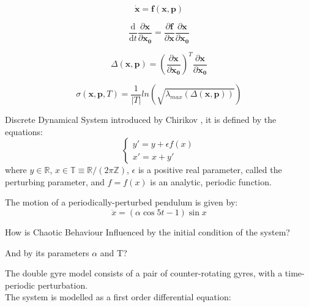 \documentclass{juliacon}
\newcommand{\drv}{\textrm{d}}
\begin{document}
\begin{equation}
    \dot{\mathbf{x}}=\mathbf{f}(\mathbf{x}, \mathbf{p})
\end{equation}

\begin{equation}
    \frac{\drv}{\drv t} \frac{\partial \mathbf{x} }{\partial \mathbf{x_0}} = \frac{\partial \mathbf{f}}{\partial \mathbf{x}}\frac{\partial \mathbf{x}}{\partial \mathbf{x_0}}
\end{equation}

\begin{equation}
    \Delta(\mathbf{x}, \mathbf{p}) = \left( \frac{\partial \mathbf{x}}{\partial \mathbf{x_0}}\right)^T \frac{\partial \mathbf{x}}{\partial \mathbf{x_0}}
\end{equation}

\begin{equation}
    \sigma(\mathbf{x}, \mathbf{p}, T)=\frac{1}{|T|}ln(\sqrt{\lambda_{max}(\Delta(\mathbf{x}, \mathbf{p}))})
\end{equation}

Discrete Dynamical System introduced by Chirikov \cite{CHIRIKOV1979263}, it is defined by the equations:
\begin{equation}
    \begin{cases}
    y'=y+\epsilon f(x) \\
    x'=x+y'
\end{cases}
\end{equation}
where $y\in\mathbb{R}$, $x\in\mathbb{T}\equiv \mathbb{R}/(2\pi\mathbb{Z})$, $\epsilon$ is a positive real parameter, called the perturbing parameter, and $f = f(x)$ is an analytic, periodic function.
\vspace{0.5cm}

The motion of a periodically-perturbed pendulum is given by:
\begin{equation}
\ddot{x}=(\alpha \cos5t -1 )\sin x
\end{equation}

How is Chaotic Behaviour Influenced by the initial condition of the system? 

And by its parameters $\alpha$ and T?

The double gyre model consists of a pair of counter-rotating gyres, with a time-periodic perturbation. \\ The system is modelled as a first order differential equation:
\end{document}
